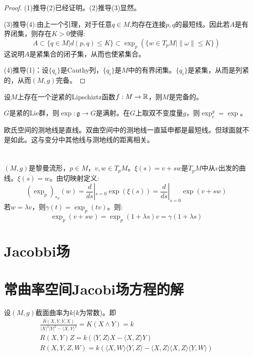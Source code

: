     \begin{proof}
        (1)推导(2)已经证明。(2)推导(3)显然。
        
        (3)推导(4):由上一个引理，对于任意$q \in M$,均存在连接$p,q$的最短线。因此若$A$是有界闭集，则存在$K>0$使得:
        $$
        A\subset \{q \in M|d(p,q)\leq K\} \subset \exp_p(\{w\in T_p M|\|\omega\|\leq K\})
        $$
        这说明$A$是紧集合的闭子集，从而也使紧集合。

        (4)推导(1)：设$\{q_i\}$是Cauthy列，$\overline{\{q_i\}}$是$M$中的有界闭集。$\overline{\{q_i\}}$是紧集，从而是列紧的，从而$(M,g)$完备。
    \end{proof}
    \begin{corollary}
        设$M$上存在一个逆紧的Lipschiztz函数$f:M \to \mathbb{R}$，则$M$是完备的。
    \end{corollary}
    \begin{corollary}
        $G$是紧的Lie群，则$\exp: \mathfrak{g}\to G$是满射。在$G$上取双不变度量$g$，则$\exp_e^g=\exp$。
    \end{corollary}
    \begin{example}
        欧氏空间的测地线是直线。双曲空间中的测地线一直延申都是最短线。但球面就不是如此。这与变分中其他线与测地线的距离相关。
    \end{example}
\section{}
\begin{definition}
    $(M,g)$是黎曼流形，$p \in M$，$v,w \in T_pM$。$\xi(s)=v+sw$是$T_pM$中从$v$出发的曲线。$\xi(s)=w$。由切映射定义:
    $$
    (\exp_p)_{*v}(w)=\dfrac{d}{ds}|_{s=0}\exp(\xi(s))=\dfrac{d}{ds}|_{s=0}\exp(v+sw)
    $$
    若$w=\lambda v$，则$\gamma(t)=\exp_p(tv)$。则:
    $$
    \exp_p(v+sw)=\exp_p(1+\lambda s )v=\gamma(1+\lambda s)
    $$
\end{definition}
\section{Jacobbi场}
\section{常曲率空间Jacobi场方程的解}
设$(M,g)$截面曲率为$k$($k$为常数)。即
\begin{align*}
    \frac{R(X,Y,Y,X)}{|X|^2|Y|^2-\langle X,Y \rangle^2}=K(X\wedge Y)=k\\
    R(X,Y)Z=k(\langle Y,Z\rangle X-\langle X,Z\rangle Y)\\
    R(X,Y,Z,W)=k(\langle X,W \rangle\langle Y,Z \rangle-\langle X,Z\rangle \langle X,Z\rangle \langle Y,W\rangle)
\end{align*}

